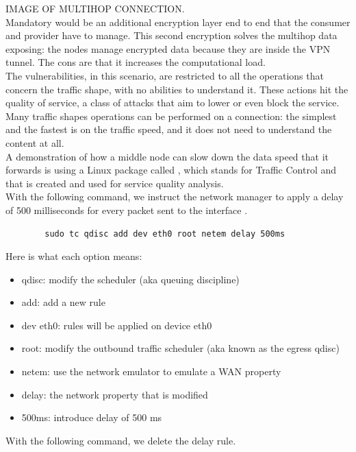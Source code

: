 \documentclass[12pt]{article}
\begin{document}
	IMAGE OF MULTIHOP CONNECTION.\\

	Mandatory would be an additional encryption layer end to end that the consumer and provider have to manage. This second encryption solves the multihop data exposing: the nodes manage encrypted data because they are inside the VPN tunnel. The cons are that it increases the computational load.\\
	The vulnerabilities, in this scenario, are restricted to all the operations that concern the traffic shape, with no abilities to understand it. These actions hit the quality of service, a class of attacks that aim to lower or even block the service.\\
	Many traffic shapes operations can be performed on a connection: the simplest and the fastest is on the traffic speed, and it does not need to understand the content at all.\\
	A demonstration of how a middle node can slow down the data speed that it forwards is using a Linux package called  \cite{tc}, which stands for Traffic Control and that is created and used for service quality analysis.\\
	With the following command, we instruct the network manager to apply a delay of 500 milliseconds for every packet sent to the interface .\\
	
	\begin{lstlisting}
		sudo tc qdisc add dev eth0 root netem delay 500ms
	\end{lstlisting}
	
	Here is what each option means:
	\begin{itemize}
		\item qdisc: modify the scheduler (aka queuing discipline)
		\item add: add a new rule
		\item dev eth0: rules will be applied on device eth0
		\item root: modify the outbound traffic scheduler (aka known as the egress qdisc)
		\item netem: use the network emulator to emulate a WAN property
		\item delay: the network property that is modified
		\item 500ms: introduce delay of 500 ms
	\end{itemize}

	With the following command, we delete the delay rule.\\
\end{document}
